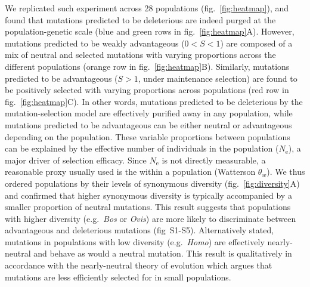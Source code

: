 \documentclass{article}
\newcommand{\Ne}{N_{\textrm{e}}}
\newcommand{\Sphy}{S}
\newcommand{\divWeakAdv}{0 < \Sphy < 1}
\newcommand{\divAdv}{ \Sphy > 1}
\begin{document}
    We replicated such experiment across 28 populations (fig.~\ref{fig:heatmap}), and found that mutations predicted to be deleterious are indeed purged at the population-genetic scale (blue and green rows in fig.~\ref{fig:heatmap}A).
    However, mutations predicted to be weakly advantageous ($\divWeakAdv$) are composed of a mix of neutral and selected mutations with varying proportions across the different populations (orange row in fig.~\ref{fig:heatmap}B).
    Similarly, mutations predicted to be advantageous ($\divAdv$, under maintenance selection) are found to be positively selected with varying proportions across populations (red row in fig.~\ref{fig:heatmap}C).
    In other words, mutations predicted to be deleterious by the mutation-selection model are effectively purified away in any population, while mutations predicted to be advantageous can be either neutral or advantageous depending on the population.
    These variable proportions between populations can be explained by the effective number of individuals in the population ($\Ne$), a major driver of selection efficacy.
    Since $\Ne$ is not directly measurable, a reasonable proxy usually used is the within a population (Watterson $\theta_w$).
    We thus ordered populations by their levels of synonymous diversity (fig.~\ref{fig:diversity}A) and confirmed that higher synonymous diversity is typically accompanied by a smaller proportion of neutral mutations.
    This result suggests that populations with higher diversity (e.g.~\textit{Bos} or \textit{Ovis}) are more likely to discriminate between advantageous and deleterious mutations (fig~S1-S5).
    Alternatively stated, mutations in populations with low diversity (e.g.~\textit{Homo}) are effectively nearly-neutral and behave as would a neutral mutation.
    This result is qualitatively in accordance with the nearly-neutral theory of evolution which argues that mutations are less efficiently selected for in small populations.
\end{document}

